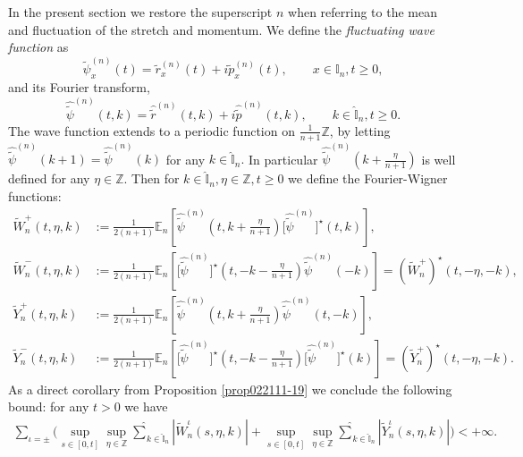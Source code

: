 \documentclass[EJP]{ejpecp} %
\newcommand\T{{\mathbb I}}
\newcommand\Z{{\mathbb Z}}
\renewcommand{\ge}{\geqslant}
\renewcommand{\hat}{\widehat}
\renewcommand{\tilde}{\widetilde}
\numberwithin{equation}{section}
\begin{document}
In the present section we restore the superscript $n$ when referring
to the mean and fluctuation of the stretch and momentum.
We define the \emph{fluctuating wave function} as
\begin{equation}
  \label{eq:wfx}
  \tilde \psi_x^{(n)}(t) =\tilde  r_x^{(n)}(t)  + i \tilde  p_x^{(n)}(t) , \qquad  x \in\T_n, t\geqslant 0,
\end{equation}
and its  Fourier transform,
\begin{equation}
  \label{eq:wf}
  \widehat{ \tilde\psi}^{(n)} (t,k) = {\widehat{ \tilde  r}}^{(n)} (t,k) + i {\widehat{ \tilde  p}}^{(n)} (t,k) , \qquad k\in \hat \T_n, t\ge 0.
\end{equation}
The wave function extends to a periodic function on $\frac{1}{n+1}\Z $, by
letting 
$
\widehat{\tilde\psi}^{(n)}(k +1) = \widehat{\tilde \psi}^{(n)}(k)$  for any 
$k\in \widehat \T_n.
$ 
In particular $\widehat{\tilde\psi}^{(n)}\left(k+\frac{\eta}{n+1}\right)$ is well defined for any $\eta\in \Z$.
Then for $k\in \widehat \T_n, \eta\in\Z, t \ge 0$ we define the Fourier-Wigner functions: 
\begin{align*}
\tilde   W^+_n(t,\eta,k)& := \frac 1{2(n+1)} \mathbb E_n\left[  \widehat{\tilde\psi}^{(n)}\left(t,k+\tfrac{\eta}{n+1}\right) \big[\widehat{\tilde\psi}^{(n)}\big]^{\star}(t,k)\right],\\
 \tilde    W^-_n(t, \eta,k)& := \frac 1{2(n+1)} \mathbb E_n\left[  \big[\widehat{\tilde\psi}^{(n)}\big]^\star\left(t,-k-\tfrac{\eta}{n+1}\right) \widehat{\tilde\psi}^{(n)}(-k)\right]=(\tilde W^+_n)^\star(t,-\eta,-k),
\\
 \tilde    Y^+_n(t, \eta,k) &:= \frac 1{2(n+1)} \mathbb E_n\left[
    \widehat{\tilde\psi}^{(n)}\left(t,k+\tfrac{\eta}{n+1}\right)
    \widehat{\tilde\psi}^{(n)}(t,-k)\right],\\
\tilde    Y^-_n(t, \eta,k) &:= \frac 1{2(n+1)} \mathbb E_n\left[
    \big[\widehat{\tilde\psi}^{(n)}\big]^\star\left(t,-k-\tfrac{\eta}{n+1}\right)
   \big[\widehat{\tilde\psi}^{(n)}\big]^\star(k)\right]=(\tilde Y^+_n)^\star(t,-\eta,-k).
\end{align*}
As a direct corollary from  Proposition \ref{prop022111-19} we
conclude the following bound: for any $t>0$ we have
\begin{align}
\label{042111-19}
\sum_{\iota=\pm}\bigg(\sup_{s\in[0,t]}\sup_{\eta\in\Z}\underset{{k\in \widehat{\T}_n}}{{\hat\sum}} | \tilde  W^\iota_n(s, \eta,k)|+\sup_{s\in[0,t]}\sup_{\eta\in\Z}\underset{{k\in \widehat{\T}_n}}{{\hat\sum}}| \tilde  Y^\iota_n(s,\eta,k)| \bigg)<+\infty.
\end{align}
\end{document}
